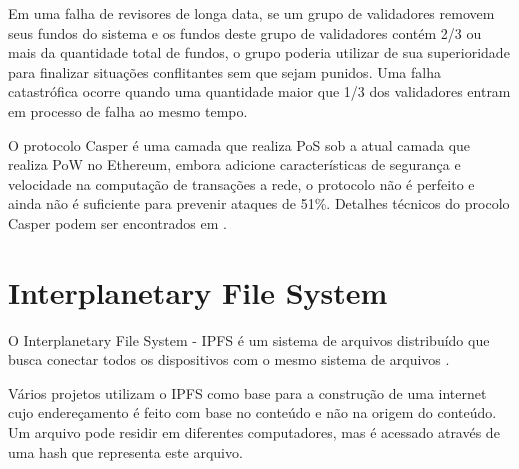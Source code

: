 \documentclass[tcc,capa]{texufpel}
\begin{document}
    Em uma falha de revisores de longa data, se um grupo de validadores removem seus fundos do sistema e os fundos deste grupo de validadores contém 2/3 ou mais da quantidade total de fundos, o grupo poderia utilizar de sua superioridade para finalizar situações conflitantes sem que sejam punidos. Uma falha catastrófica ocorre quando uma quantidade maior que 1/3 dos validadores entram em processo de falha ao mesmo tempo.
    
    O protocolo Casper é uma camada que realiza PoS sob a atual camada que realiza PoW no Ethereum, embora adicione características de segurança e velocidade na computação de transações a rede, o protocolo não é perfeito e ainda não é suficiente para prevenir ataques de 51\%. Detalhes técnicos do procolo Casper podem ser encontrados em \cite{buterin2017}.
    
    

    
    
    
    
    
\section{Interplanetary File System}

    O Interplanetary File System - IPFS é um sistema de arquivos distribuído que busca conectar todos os dispositivos com o mesmo sistema de arquivos \cite{benet2014ipfs}.
    
    Vários projetos utilizam o IPFS como base para a construção de uma internet cujo endereçamento é feito com base no conteúdo e não na origem do conteúdo. Um arquivo pode residir em diferentes computadores, mas é acessado através de uma hash que representa este arquivo. 
    
\end{document}
